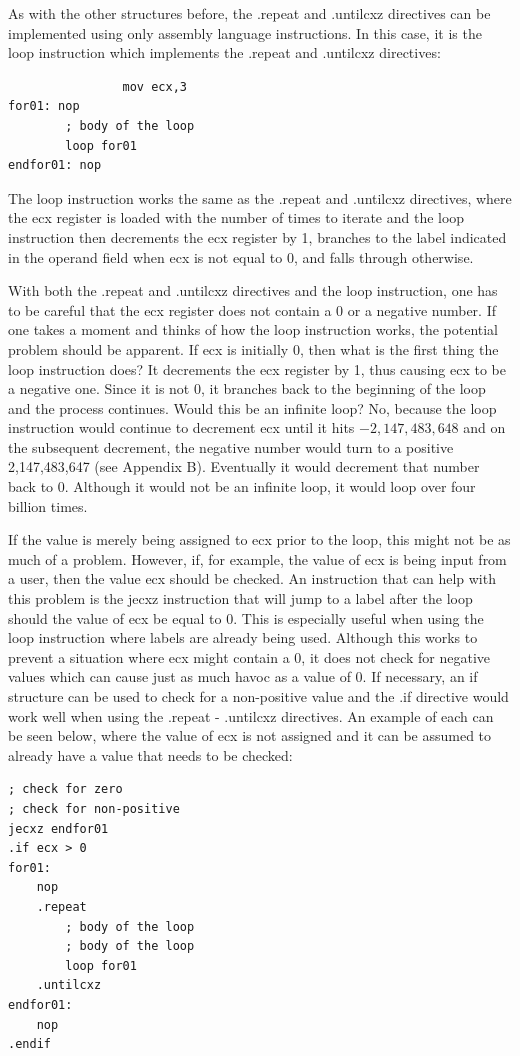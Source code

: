 \documentclass[10pt]{book}
\begin{document}
As with the other structures before, the .repeat and .untilcxz directives can be implemented using only assembly language instructions. In this case, it is the loop instruction which implements the .repeat and .untilcxz directives:

\begin{verbatim}
                mov ecx,3
for01: nop
        ; body of the loop
        loop for01
endfor01: nop
\end{verbatim}

The loop instruction works the same as the .repeat and .untilcxz directives, where the ecx register is loaded with the number of times to iterate and the loop instruction then decrements the ecx register by 1, branches to the label indicated in the operand field when ecx is not equal to 0, and falls through otherwise.

With both the .repeat and .untilcxz directives and the loop instruction, one has to be careful that the ecx register does not contain a 0 or a negative number. If one takes a moment and thinks of how the loop instruction works, the potential problem should be apparent. If ecx is initially 0, then what is the first thing the loop instruction does? It decrements the ecx register by 1, thus causing ecx to be a negative one. Since it is not 0, it branches back to the beginning of the loop and the process continues. Would this be an infinite loop? No, because the loop instruction would continue to decrement ecx until it hits $-2,147,483,648$ and on the subsequent decrement, the negative number would turn to a positive 2,147,483,647 (see Appendix B). Eventually it would decrement that number back to 0. Although it would not be an infinite loop, it would loop over four billion times.

If the value is merely being assigned to ecx prior to the loop, this might not be as much of a problem. However, if, for example, the value of ecx is being input from a user, then the value ecx should be checked. An instruction that can help with this problem is the jecxz instruction that will jump to a label after the loop should the value of ecx be equal to 0. This is especially useful when using the loop instruction where labels are already being used. Although this works to prevent a situation where ecx might contain a 0, it does not check for negative values which can cause just as much havoc as a value of 0. If necessary, an if structure can be used to check for a non-positive value and the .if directive would\\
work well when using the .repeat - .untilcxz directives. An example of each can be seen below, where the value of ecx is not assigned and it can be assumed to already have a value that needs to be checked:
\begin{verbatim}
; check for zero
; check for non-positive
jecxz endfor01
.if ecx > 0
for01:
    nop
    .repeat
        ; body of the loop
        ; body of the loop
        loop for01
    .untilcxz
endfor01:
    nop
.endif
\end{verbatim}
\end{document}
